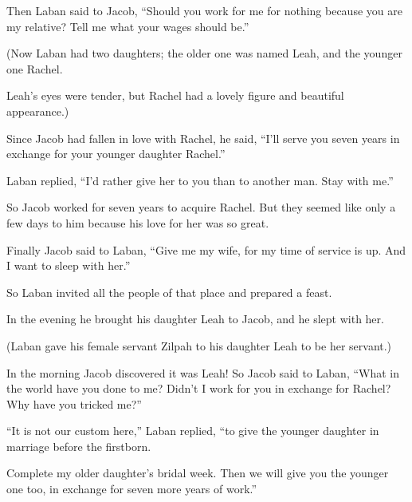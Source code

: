\begin{scripture}
 Then Laban said to Jacob, ``Should you work for me for nothing because you are my relative? Tell me what your wages should be.''
 (Now Laban had two daughters; the older one was named Leah, and the younger one Rachel.
 Leah's eyes were tender, but Rachel had a lovely figure and beautiful appearance.)
 Since Jacob had fallen in love with Rachel, he said, ``I'll serve you seven years in exchange for your younger daughter Rachel.''
 Laban replied, ``I'd rather give her to you than to another man. Stay with me.''
 So Jacob worked for seven years to acquire Rachel. But they seemed like only a few days to him because his love for her was so great.
\everypar{}

 Finally Jacob said to Laban, ``Give me my wife, for my time of service is up. And I want to sleep with her.''
 So Laban invited all the people of that place and prepared a feast.
 In the evening he brought his daughter Leah to Jacob, and he slept with her.
 (Laban gave his female servant Zilpah to his daughter Leah to be her servant.)
\everypar{}

 In the morning Jacob discovered it was Leah! So Jacob said to Laban, ``What in the world have you done to me? Didn't I work for you in exchange for Rachel? Why have you tricked me?''
 ``It is not our custom here,'' Laban replied, ``to give the younger daughter in marriage before the firstborn.
 Complete my older daughter's bridal week. Then we will give you the younger one too, in exchange for seven more years of work.''
\everypar{}


\end{scripture}
